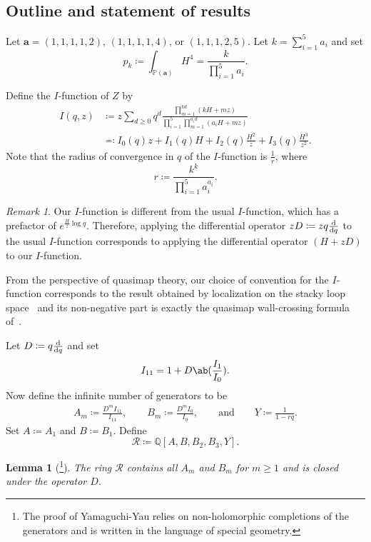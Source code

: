 \documentclass[10pt]{amsart}
\newtheorem{lem}[thm]{Lemma}
\theoremstyle{definition}
\theoremstyle{remark}
\newtheorem{rmk}[thm]{Remark}
\theoremstyle{plain}
\theoremstyle{definition}
\theoremstyle{remark}
\newcommand{\Q}{\mathbb{Q}}
\newcommand{\ba}{\mathbf{a}}
\renewcommand{\P}{\mathbb{P}}
\newcommand{\msc}[1]{\mathscr{#1}}
\newcommand{\1}{\mathbf{1}}
\newcommand{\2}{\mathbf{2}}
\newcommand{\3}{\mathbf{3}}
\numberwithin{equation}{section}
\begin{document}
\subsection{Outline and statement of results}%
\label{sub:Outline and statement of results}

Let $\ba = (1,1,1,1,2)$, $(1,1,1,1,4)$, or $(1,1,1,2,5)$. Let $k = \sum_{i=1}^5 a_i$ and set
\[ p_k \coloneqq \int_{\P(\ba)} H^4 = \frac{k}{\prod_{i=1}^5 a_i}. \]

Define the $I$-function of $Z$ by
\begin{align*}
    I(q,z) &\coloneqq z\sum_{d \geq 0} q^d \frac{\prod_{m=1}^{kd}(kH+mz)}{\prod_{i=1}^5 \prod_{m=1}^{a_i d} (a_i H + mz)} \\
    &\eqqcolon I_0(q)z + I_1(q) H+ I_2(q) \frac{H^2}{z} + I_3(q) \frac{H^3}{z^2}.
\end{align*}
Note that the radius of convergence in $q$ of the $I$-function is $\frac{1}{r}$, where
\[ r \coloneqq \frac{k^k}{\prod_{i=1}^5 a_i^{a_i}}. \]

\begin{rmk}
    Our $I$-function is different from the usual $I$-function, which has a prefactor of $e^{\frac{H}{z}\log q}$. Therefore, applying the differential operator $zD \coloneqq zq \odv{}{q}$ to the usual $I$-function corresponds to applying the differential operator $(H+zD)$ to our $I$-function. 

    From the perspective of quasimap theory, our choice of convention for the $I$-function corresponds to the result obtained by localization on the stacky loop space~\cite[Proposition 4.9]{orbqmap} and its non-negative part is exactly the quasimap wall-crossing formula of~\cite{qmapwc}.
\end{rmk}

Let $D \coloneqq q\odv{}{q}$ and set 
\[I_{11} = 1+D\ab(\frac{I_1}{I_0}).\] 
Now define the infinite number of generators to be
\begin{align*}
    A_m \coloneqq \frac{D^m I_{11}}{I_{11}}, \qquad 
    B_m \coloneqq \frac{D^m I_{0}}{I_{0}}, \qquad \text{and} \qquad
    Y \coloneqq \frac{1}{1-rq}.
\end{align*}
Set $A \coloneqq A_1$ and $B \coloneqq B_1$. Define
\[ \msc{R} \coloneqq \Q[A,B, B_2, B_3, Y]. \]
\begin{lem}[\cite{yy04}\footnote{The proof of Yamaguchi-Yau relies on non-holomorphic completions of the generators and is written in the language of special geometry.}]
    The ring $\msc{R}$ contains all $A_m$ and $B_m$ for $m \geq 1$ and is closed under the operator $D$.
\end{lem}
\end{document}
